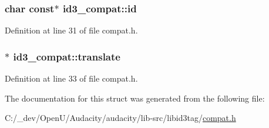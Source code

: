 \subsubsection[{\texorpdfstring{id}{id}}]{\setlength{\rightskip}{0pt plus 5cm}char {\bf const}$\ast$ id3\+\_\+compat\+::id}\hypertarget{structid3__compat_a4bbfd05aa33c47385219a3f8d4d711c4}{}\label{structid3__compat_a4bbfd05aa33c47385219a3f8d4d711c4}


Definition at line 31 of file compat.\+h.

\subsubsection[{\texorpdfstring{translate}{translate}}]{$\ast$ id3\+\_\+compat\+::translate}\hypertarget{structid3__compat_a99f45f7c496cce28f8460562e949b427}{}\label{structid3__compat_a99f45f7c496cce28f8460562e949b427}


Definition at line 33 of file compat.\+h.



The documentation for this struct was generated from the following file\+:\begin{DoxyCompactItemize}
\item 
C\+:/\+\_\+dev/\+Open\+U/\+Audacity/audacity/lib-\/src/libid3tag/\hyperlink{libid3tag_2compat_8h}{compat.\+h}\end{DoxyCompactItemize}
